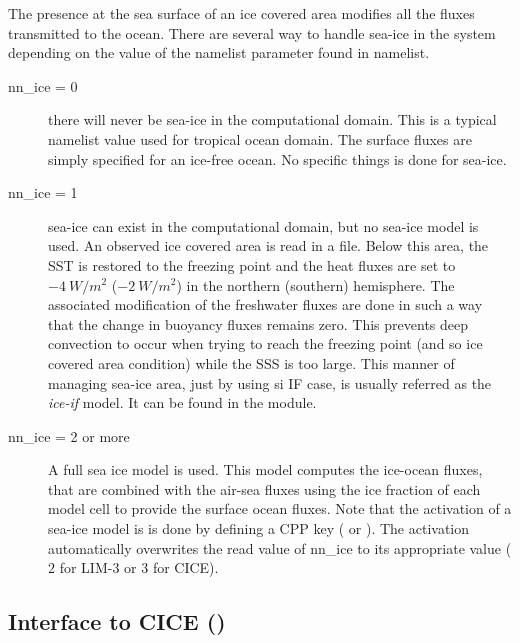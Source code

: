 \documentclass[../main/NEMO_manual]{subfiles}
\begin{document}
The presence at the sea surface of an ice covered area modifies all the fluxes transmitted to the ocean.
There are several way to handle sea-ice in the system depending on
the value of the  namelist parameter found in  namelist.
\begin{description}
\item[nn{\_}ice = 0]
  there will never be sea-ice in the computational domain.
  This is a typical namelist value used for tropical ocean domain.
  The surface fluxes are simply specified for an ice-free ocean.
  No specific things is done for sea-ice.
\item[nn{\_}ice = 1]
  sea-ice can exist in the computational domain, but no sea-ice model is used.
  An observed ice covered area is read in a file.
  Below this area, the SST is restored to the freezing point and
  the heat fluxes are set to $-4~W/m^2$ ($-2~W/m^2$) in the northern (southern) hemisphere.
  The associated modification of the freshwater fluxes are done in such a way that
  the change in buoyancy fluxes remains zero.
  This prevents deep convection to occur when trying to reach the freezing point
  (and so ice covered area condition) while the SSS is too large.
  This manner of managing sea-ice area, just by using si IF case,
  is usually referred as the \textit{ice-if} model.
  It can be found in the  module.
\item[nn{\_}ice = 2 or more]
  A full sea ice model is used.
  This model computes the ice-ocean fluxes,
  that are combined with the air-sea fluxes using the ice fraction of each model cell to
  provide the surface ocean fluxes.
  Note that the activation of a sea-ice model is is done by defining a CPP key ( or ).
  The activation automatically overwrites the read value of nn{\_}ice to its appropriate value
  (\ie $2$ for LIM-3 or $3$ for CICE).
\end{description}


\subsection{Interface to CICE (\protect{})}
\label{subsec:SBC_cice}
\end{document}
